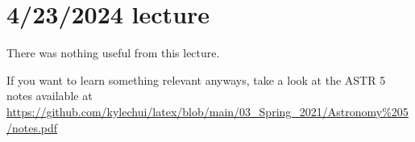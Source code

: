 \documentclass[class=article, crop=false]{standalone}
\begin{document}
\section{4/23/2024 lecture}
There was nothing useful from this lecture.
\par
If you want to learn something relevant anyways, take a look at the ASTR 5 notes available at \url{https://github.com/kylechui/latex/blob/main/03_Spring_2021/Astronomy%205/notes.pdf}
\end{document}
